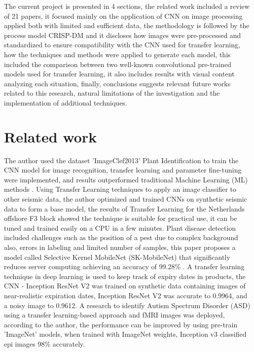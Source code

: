 \documentclass[conference]{IEEEtran}
\begin{document}
The current project is presented in 4 sections, the related work included a review of 21 papers, it focused mainly on the application of CNN on image processing applied both with limited and sufficient data, the methodology is followed by the process model CRISP-DM and it discloses how images were pre-processed and standardized to ensure compatibility with the CNN used for transfer learning, how the techniques and methods were applied to generate each model, this included the comparison between two well-known convolutional pre-trained models used for transfer learning, it also includes results with visual content analyzing each situation, finally, conclusions suggests relevant future works related to this research, natural limitations of the investigation and the implementation of additional techniques.  

\section{Related work}
The author used the dataset 'ImageClef2013' Plant Identification to train the CNN model for image recognition, transfer learning and parameter fine-tuning were implemented, and results outperformed traditional Machine Learning (ML) methods \cite{hedjazi2017identifying}. Using Transfer Learning techniques to apply an image classifier to other seismic data, the author optimized and trained CNNs on synthetic seismic data to form a base model, the results of Transfer Learning for the Netherlands offshore F3 block showed the technique is suitable for practical use, it can be tuned and trained easily on a CPU in a few minutes\cite{cunha2020seismic}. Plant disease detection included challenges such as the position of a pest due to complex background also, errors in labeling and limited number of samples, this paper proposes a model called Selective Kernel MobileNet (SK-MobileNet) that significantly reduces server computing achieving an accuracy of 99.28\% \cite{liu2022sk}. A transfer learning technique in deep learning is used to keep track of expiry dates in products, the CNN - Inception ResNet V2 was trained on synthetic data containing images of near-realistic expiration dates,  Inception ResNet V2 was accurate to 0.9964, and a noisy image to 0.9612\cite{ong2021transfer}. A research to identify Autism Spectrum Disorder (ASD) using a transfer learning-based approach and fMRI images was deployed, according to the author, the performance can be improved by using pre-train 'ImageNet' models, when trained with ImageNet weights, Inception v3 classified epi images 98\% accurately\cite{herath2021autism}.\
\end{document}
